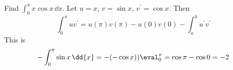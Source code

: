 \documentclass{report}
\begin{document}
\begin{examples}
    \begin{example}
        Find $\int_{   0}^{\pi} x\cos{x} \, \dd{x} $. Let $u = x$, $v = \sin{x}$, $v^{\prime} = \cos{x}$. Then
            \begin{equation*}
                \int_{0}^{\pi}  uv^{\prime} = u(\pi) v(\pi) - u(0)v(0) - \int_{a}^{b} u^{\prime}v^{\prime} 
            \end{equation*}
        This is 
            \begin{equation*}
                -\int_{0}^{\pi}  \sin{x} \, \dd{x}  = -(-\cos{x}))\eval_{0}^{\pi} = \cos{\pi} - \cos{0} = -2
            \end{equation*}
    \end{example}
\end{examples}
\end{document}
